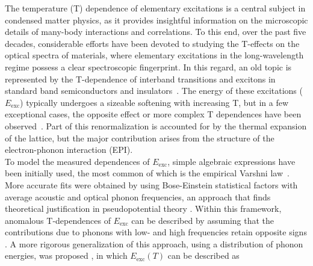 \documentclass[aps,prl,twocolumn,amsfonts,nobibnotes,superscriptaddress,showpacs]{revtex4-1}
\begin{document}
\pacs{}

\maketitle

The temperature (T) dependence of elementary excitations is a central subject in condensed matter physics, as it provides insightful information on the microscopic details of many-body interactions and correlations. To this end, over the past five decades, considerable efforts have been devoted to studying the T-effects on the optical spectra of materials, where elementary excitations in the long-wavelength regime possess a clear spectroscopic fingerprint. In this regard, an old topic is represented by the T-dependence of interband transitions and excitons in standard band semiconductors and insulators~\cite{cardona2001renormalization, giustino}. The energy of these excitations ($E\mathrm{_{exc}}$) typically undergoes a sizeable softening with increasing T, but in a few exceptional cases, the opposite effect or more complex T dependences have been observed~\cite{keffer1968pbte, yu1973anomalous, rossle2013optical}. Part of this renormalization is accounted for by the thermal expansion of the lattice, but the major contribution arises from the structure of the electron-phonon interaction (EPI). \\
\indent To model the measured dependences of $E\mathrm{_{exc}}$, simple algebraic expressions have been initially used, the most common of which is the empirical Varshni law~\cite{varshni1967temperature}. More accurate fits were obtained by using Bose-Einstein statistical factors with average acoustic and optical phonon frequencies, an approach that finds theoretical justification in pseudopotential theory \cite{allen1983temperature}. Within this framework, anomalous T-dependences of $E\mathrm{_{exc}}$ can be described by assuming that the contributions due to phonons with low- and high frequencies retain opposite signs \cite{vina1984temperature}. A more rigorous generalization of this approach, using a distribution of phonon energies, was proposed \cite{collins1990indirect}, in which $E\mathrm{_{exc}}(T)$ can be described as
\end{document}
